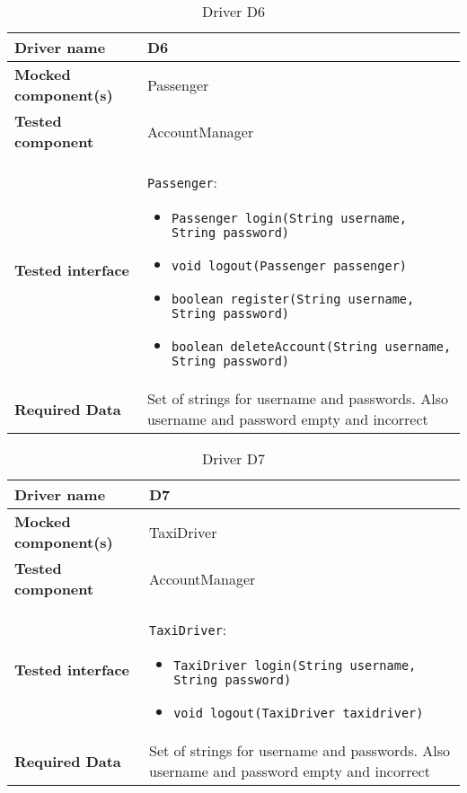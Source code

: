 \begin{table}[H]
	\begin{tabular}{ l | p{} }
		\textbf{Driver name} & D6\label{D6} \\ \hline
		\textbf{Mocked component(s)} & Passenger \\ \hline
		\textbf{Tested component} & AccountManager \\ \hline
		\textbf{Tested interface} & \texttt{Passenger}:
		\begin{itemize}
			\item \texttt{Passenger login(String username, String password)}
			\item \texttt{void logout(Passenger passenger)}
			\item \texttt{boolean register(String username, String password)}
			\item \texttt{boolean deleteAccount(String username, String password)}
		\end{itemize} \\ \hline
		\textbf{Required Data} & Set of strings for username and passwords. Also username and password empty and incorrect
	\end{tabular}
	\caption{Driver D6}
\end{table}

\begin{table}[H]
	\begin{tabular}{ l | p{} }
		\textbf{Driver name} & D7\label{D7} \\ \hline
		\textbf{Mocked component(s)} & TaxiDriver \\ \hline
		\textbf{Tested component} & AccountManager \\ \hline
		\textbf{Tested interface} & \texttt{TaxiDriver}:
		\begin{itemize}
			\item \texttt{TaxiDriver login(String username, String password)}
			\item \texttt{void logout(TaxiDriver taxidriver)}
		\end{itemize} \\ \hline
		\textbf{Required Data} & Set of strings for username and passwords. Also username and password empty and incorrect
	\end{tabular}
	\caption{Driver D7}
\end{table}

